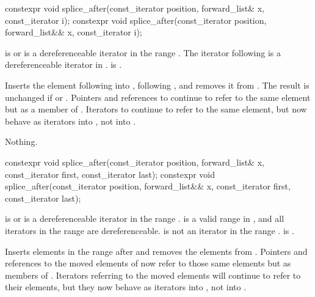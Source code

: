 %
\begin{itemdecl}
constexpr void splice_after(const_iterator position, forward_list& x, const_iterator i);
constexpr void splice_after(const_iterator position, forward_list&& x, const_iterator i);
\end{itemdecl}

\begin{itemdescr}
\pnum
\expects
{} is  or is a dereferenceable
iterator in the range .
The iterator following  is a dereferenceable iterator in .
 is .

\pnum
\effects
Inserts the element following  into , following
, and removes it from .
The result is unchanged if  or . Pointers
and references to  continue to refer to the same element but as a member of
. Iterators to  continue to refer to
the same element, but now behave as iterators into , not into .

\pnum
\throws
Nothing.

\pnum
\complexity
{}
\end{itemdescr}

%
\begin{itemdecl}
constexpr void splice_after(const_iterator position, forward_list& x,
                            const_iterator first, const_iterator last);
constexpr void splice_after(const_iterator position, forward_list&& x,
                            const_iterator first, const_iterator last);
\end{itemdecl}

\begin{itemdescr}
\pnum
\expects
{} is  or is a
dereferenceable iterator in the range .  is a
valid range in , and all iterators in the range  are
dereferenceable.  is not an iterator in the range .
 is .

\pnum
\effects
Inserts elements in the range  after  and
removes the elements from . Pointers and references to the moved elements of
 now refer to those same elements but as members of . Iterators
referring to the moved elements will continue to refer to their elements, but they now
behave as iterators into , not into .

\pnum
\complexity
{}
\end{itemdescr}

